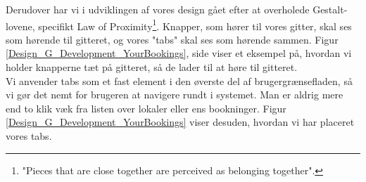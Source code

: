 Derudover har vi i udviklingen af vores design gået efter at overholede Gestalt-lovene\cite[s. 68]{SL_UID}, specifikt Law of Proximity\footnote{"Pieces that are close together are perceived as belonging together".}. Knapper, som hører til vores gitter, skal ses som hørende til gitteret, og vores "tabs" skal ses som hørende sammen. Figur \ref{Design_G_Development_YourBookings}, side \pageref{Design_G_Development_YourBookings} viser et eksempel på, hvordan vi holder knapperne tæt på gitteret, så de lader til at høre til gitteret.
\\Vi anvender tabs som et fast element i den øverste del af brugergrænsefladen, så vi gør det nemt for brugeren at navigere rundt i systemet. Man er aldrig mere end to klik væk fra listen over lokaler eller ens bookninger. Figur \ref{Design_G_Development_YourBookings} viser desuden, hvordan vi har placeret vores tabs.